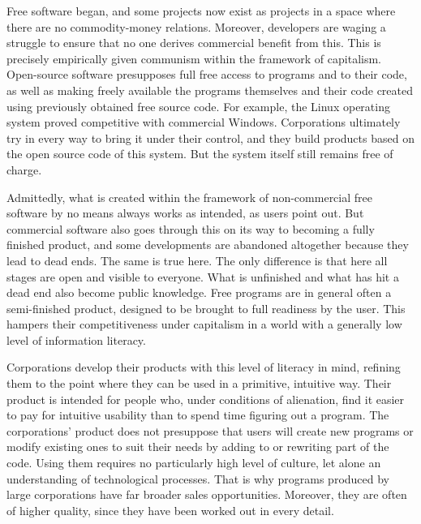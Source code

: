 \documentclass[../main]{subfiles}
\begin{document}
Free software began, and some projects now exist as projects in a space where there are no commodity-money relations. Moreover, developers are waging a struggle to ensure that no one derives commercial benefit from this. This is precisely empirically given communism within the framework of capitalism. Open-source software presupposes full free access to programs and to their code, as well as making freely available the programs themselves and their code created using previously obtained free source code. For example, the Linux operating system proved competitive with commercial Windows. Corporations ultimately try in every way to bring it under their control, and they build products based on the open source code of this system. But the system itself still remains free of charge.

Admittedly, what is created within the framework of non-commercial free software by no means always works as intended, as users point out. But commercial software also goes through this on its way to becoming a fully finished product, and some developments are abandoned altogether because they lead to dead ends. The same is true here. The only difference is that here all stages are open and visible to everyone. What is unfinished and what has hit a dead end also become public knowledge. Free programs are in general often a semi-finished product, designed to be brought to full readiness by the user. This hampers their competitiveness under capitalism in a world with a generally low level of information literacy.

Corporations develop their products with this level of literacy in mind, refining them to the point where they can be used in a primitive, intuitive way. Their product is intended for people who, under conditions of alienation, find it easier to pay for intuitive usability than to spend time figuring out a program. The corporations' product does not presuppose that users will create new programs or modify existing ones to suit their needs by adding to or rewriting part of the code. Using them requires no particularly high level of culture, let alone an understanding of technological processes. That is why programs produced by large corporations have far broader sales opportunities. Moreover, they are often of higher quality, since they have been worked out in every detail.
\end{document}
